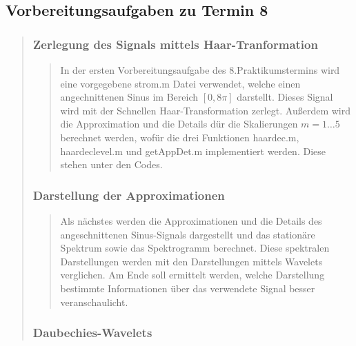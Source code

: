     \subsection{Vorbereitungsaufgaben zu Termin 8}
    \begin{quote}
    
        \subsubsection{Zerlegung des Signals mittels Haar-Tranformation}
        \begin{quote}
        
        In der ersten Vorbereitungsaufgabe des 8.Praktikumstermins wird eine
        vorgegebene strom.m Datei verwendet, welche einen angechnittenen Sinus
        im Bereich $[0,8\pi]$ darstellt. Dieses Signal wird mit der Schnellen
        Haar-Transformation zerlegt. Außerdem wird die Approximation und die
        Details dür die Skalierungen $m = 1 \ldots 5$ berechnet werden, wofür
        die drei Funktionen haardec.m, haardeclevel.m und getAppDet.m
        implementiert werden. Diese stehen unter den Codes.
        
        \end{quote}%
        
        
        \subsubsection{Darstellung der Approximationen}
        \begin{quote}
        
        Als nächstes werden die Approximationen und die Details des
        angeschnittenen Sinus-Signals dargestellt und das stationäre Spektrum
        sowie das Spektrogramm berechnet. Diese spektralen Darstellungen werden
        mit den Darstellungen mittels Wavelets verglichen. Am Ende soll
        ermittelt werden, welche Darstellung bestimmte Informationen über das
        verwendete Signal besser veranschaulicht.
        
        
        \end{quote}%
        
        
        \subsubsection{Daubechies-Wavelets}
        \begin{quote}
        

\end{quote}
\end{quote}
